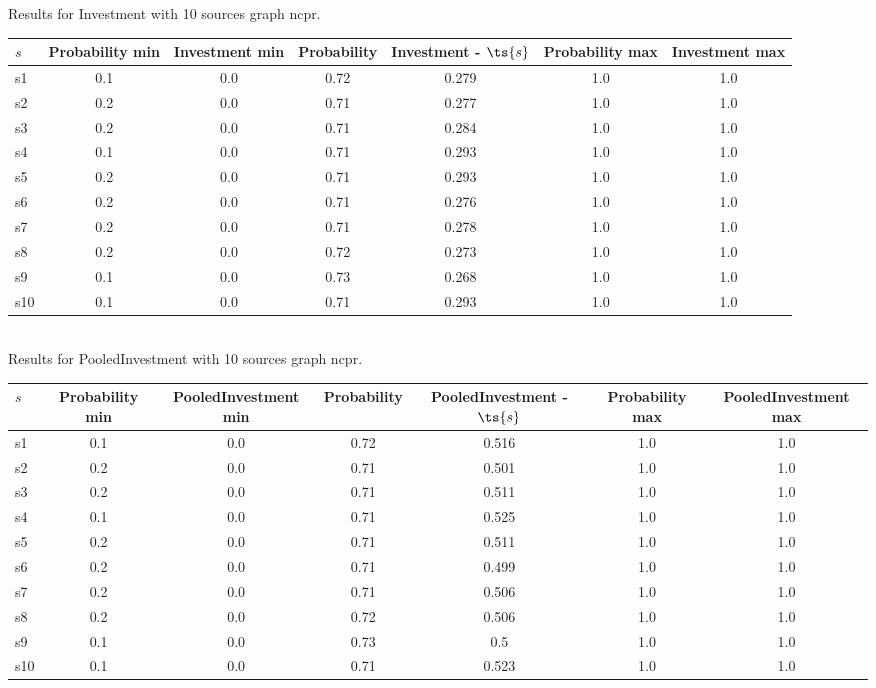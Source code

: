 \documentclass{article}
\begin{document}
\noindent Results for Investment with 10 sources graph ncpr.

\noindent\begin{tabular}{|l|c|c|c|c|c|c|}
\hline
$s$& Probability min & Investment min & Probability & Investment - $\ts{s}$ & Probability max & Investment max\\
\hline
s1 &0.1 & 0.0 & 0.72 & 0.279 & 1.0 & 1.0\\
\hline
s2 &0.2 & 0.0 & 0.71 & 0.277 & 1.0 & 1.0\\
\hline
s3 &0.2 & 0.0 & 0.71 & 0.284 & 1.0 & 1.0\\
\hline
s4 &0.1 & 0.0 & 0.71 & 0.293 & 1.0 & 1.0\\
\hline
s5 &0.2 & 0.0 & 0.71 & 0.293 & 1.0 & 1.0\\
\hline
s6 &0.2 & 0.0 & 0.71 & 0.276 & 1.0 & 1.0\\
\hline
s7 &0.2 & 0.0 & 0.71 & 0.278 & 1.0 & 1.0\\
\hline
s8 &0.2 & 0.0 & 0.72 & 0.273 & 1.0 & 1.0\\
\hline
s9 &0.1 & 0.0 & 0.73 & 0.268 & 1.0 & 1.0\\
\hline
s10 &0.1 & 0.0 & 0.71 & 0.293 & 1.0 & 1.0\\
\hline
\end{tabular}\\

\noindent Results for PooledInvestment with 10 sources graph ncpr.

\noindent\begin{tabular}{|l|c|c|c|c|c|c|}
\hline
$s$& Probability min & PooledInvestment min & Probability & PooledInvestment - $\ts{s}$ & Probability max & PooledInvestment max\\
\hline
s1 &0.1 & 0.0 & 0.72 & 0.516 & 1.0 & 1.0\\
\hline
s2 &0.2 & 0.0 & 0.71 & 0.501 & 1.0 & 1.0\\
\hline
s3 &0.2 & 0.0 & 0.71 & 0.511 & 1.0 & 1.0\\
\hline
s4 &0.1 & 0.0 & 0.71 & 0.525 & 1.0 & 1.0\\
\hline
s5 &0.2 & 0.0 & 0.71 & 0.511 & 1.0 & 1.0\\
\hline
s6 &0.2 & 0.0 & 0.71 & 0.499 & 1.0 & 1.0\\
\hline
s7 &0.2 & 0.0 & 0.71 & 0.506 & 1.0 & 1.0\\
\hline
s8 &0.2 & 0.0 & 0.72 & 0.506 & 1.0 & 1.0\\
\hline
s9 &0.1 & 0.0 & 0.73 & 0.5 & 1.0 & 1.0\\
\hline
s10 &0.1 & 0.0 & 0.71 & 0.523 & 1.0 & 1.0\\
\hline
\end{tabular}\\
\end{document}
